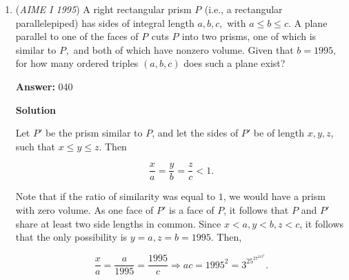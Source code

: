 \begin{enumerate}
\textbf{Solution 2}

Let our answer be $n$. Write $n = 42a + b$, where $a, b$ are positive integers and $0 \leq b < 42$. Then note that $b, b + 42, ... , b + 42(a-1)$ are all primes. 

 If $b$ is $0\mod{5}$, then $b = 5$ because $5$ is the only prime divisible by $5$. We get $n = 215$ as our largest possibility in this case. 

 If $b$ is $1\mod{5}$, then $b + 2 \times 42$ is divisible by $5$ and thus $a \leq 2$. Thus, $n \leq 3 \times 42 = 126 < 215$.

 If $b$ is $2\mod{5}$, then $b + 4 \times 42$ is divisible by $5$ and thus $a \leq 4$. Thus, $n \leq 5 \times 42 = 210 < 215$.

 If $b$ is $3\mod{5}$, then $b + 1 \times 42$ is divisible by $5$ and thus $a = 1$. Thus, $n \leq 2 \times 42 = 84 < 215$.

 If $b$ is $4\mod{5}$, then $b + 3 \times 42$ is divisible by $5$ and thus $a \leq 3$. Thus, $n \leq 4 \times 42 = 168 < 215$.

 Our answer is $\boxed{215}$.

 


	\item (\textit{AIME I 1995}) A right rectangular prism $P_{}$ (i.e., a rectangular parallelepiped) has sides of integral length $a, b, c,$ with $a\le b\le c.$  A plane parallel to one of the faces of $P_{}$ cuts $P_{}$ into two prisms, one of which is similar to $P_{},$ and both of which have nonzero volume.  Given that $b=1995,$ for how many ordered triples $(a, b, c)$ does such a plane exist?


 
 \textbf{Answer: }040



\textbf{Solution}

Let $P'$ be the prism similar to $P$, and let the sides of $P'$ be of length $x,y,z$, such that $x \le y \le z$. Then 

 
 \[\frac{x}{a} = \frac{y}{b} = \frac zc < 1.\] 

 Note that if the ratio of similarity was equal to $1$, we would have a prism with zero volume. As one face of $P'$ is a face of $P$, it follows that $P$ and $P'$ share at least two side lengths in common. Since $x < a, y < b, z < c$, it follows that the only possibility is $y=a,z=b=1995$. Then,

 
 \[\frac{x}{a} = \frac{a}{1995} = \frac{1995}{c} \Longrightarrow ac = 1995^2 = 3^25^27^219^2.\] 


\end{enumerate}
